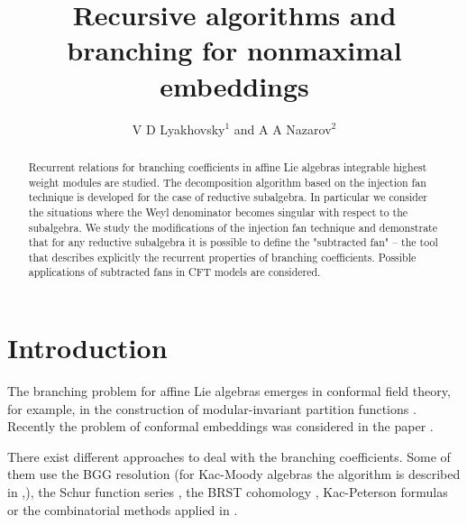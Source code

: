 \documentclass[12pt]{iopart}
\theoremstyle{definition}
\begin{document}
\title{Recursive algorithms and branching for nonmaximal embeddings}
\author{V D Lyakhovsky$^1$ and A A Nazarov$^2$}
\address{$^{1,2}$ Theoretical Department, SPb State University,
198904, Sankt-Petersburg, Russia }

\begin{abstract}
  Recurrent relations for branching coefficients in affine Lie algebras
  integrable highest weight modules are studied. The decomposition algorithm
  based on the injection fan technique is developed for the case of reductive
  subalgebra. In particular we consider the situations where
  the Weyl denominator becomes singular with respect to the subalgebra.
  We study the modifications of the injection fan technique and demonstrate
  that for any reductive subalgebra it is possible to define the
  "subtracted fan" -- the tool that describes
  explicitly the recurrent properties of branching coefficients.
  Possible applications of subtracted fans in CFT models are considered.
\end{abstract}
\submitto{\JPA}

\section{Introduction}
\label{sec:introduction}

The branching problem for affine Lie algebras emerges in conformal field theory, for example,
in the construction of modular-invariant partition functions \cite{difrancesco1997cft}.
Recently the problem of conformal embeddings was considered in the paper \cite{coquereaux2008conformal}.

There exist different approaches to deal with the branching coefficients. Some of them use the BGG
resolution \cite{bernstein1975differential} (for Kac-Moody algebras the algorithm is described in
\cite{kac1990idl},\cite{wakimoto2001idl}), the Schur function series \cite{fauser2006new}, the BRST
cohomology \cite{Hwang:1994yr}, Kac-Peterson formulas \cite{kac1990idl,quella2002branching} or the
combinatorial methods applied in \cite{feigin707principal}.
\end{document}

